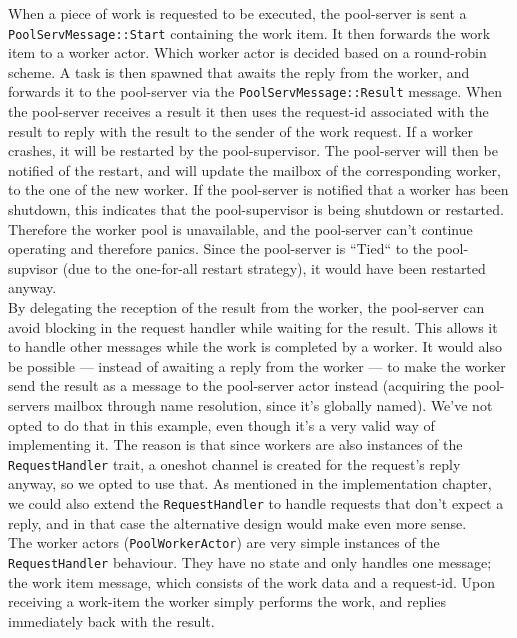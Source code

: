 \documentclass[a4paper]{article}
\begin{document}
\noindent
When a piece of work is requested to be executed, the pool-server is sent a
\texttt{PoolServMessage::Start} containing the work item. It then forwards the
work item to a worker actor. Which worker actor is decided based on a
round-robin scheme. A task is then spawned that awaits the reply from the
worker, and forwards it to the pool-server via the
\texttt{PoolServMessage::Result} message. When the pool-server receives a result
it then uses the request-id associated with the result to reply with the result
to the sender of the work request. If a worker crashes, it will be restarted by
the pool-supervisor. The pool-server will then be notified of the restart, and
will update the mailbox of the corresponding worker, to the one of the new
worker. If the pool-server is notified that a worker has been shutdown, this
indicates that the pool-supervisor is being shutdown or restarted. Therefore the
worker pool is unavailable, and the pool-server can't continue operating and
therefore panics. Since the pool-server is ``Tied`` to the pool-supvisor (due to
the one-for-all restart strategy), it would have been restarted anyway.\\

\noindent
By delegating the reception of the result from the worker, the pool-server can
avoid blocking in the request handler while waiting for the result. This allows
it to handle other messages while the work is completed by a worker. It would
also be possible --- instead of awaiting a reply from the worker --- to make the
worker send the result as a message to the pool-server actor instead (acquiring
the pool-servers mailbox through name resolution, since it's globally named).
We've not opted to do that in this example, even though it's a very valid way of
implementing it. The reason is that since workers are also instances of the
\texttt{RequestHandler} trait, a oneshot channel is created for the request's
reply anyway, so we opted to use that. As mentioned in the implementation
chapter, we could also extend the \texttt{RequestHandler} to handle requests
that don't expect a reply, and in that case the alternative design would make
even more sense.\\

\noindent
The worker actors (\texttt{PoolWorkerActor}) are very simple instances of the
\texttt{RequestHandler} behaviour. They have no state and only handles one
message; the work item message, which consists of the work data and a
request-id. Upon receiving a work-item the worker simply performs the work, and
replies immediately back with the result.\\
\end{document}
